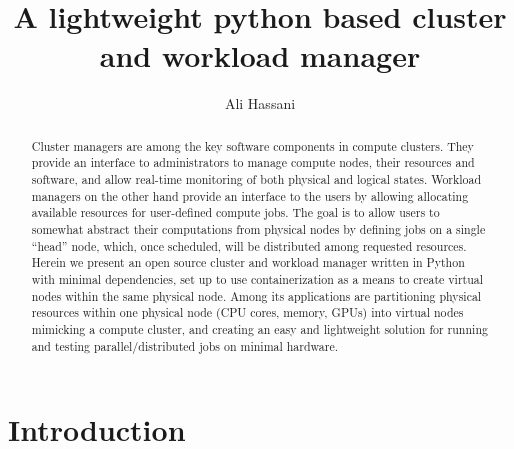 \documentclass[sigconf]{acmart}
\begin{document}
\title{A lightweight python based cluster and workload manager}


\author{Ali Hassani}

\renewcommand{\shortauthors}{Hassani}

\begin{abstract}
    Cluster managers are among the key software components in compute clusters.
    They provide an interface to administrators to manage compute nodes, their resources and software, and allow real-time
    monitoring of both physical and logical states. Workload managers on the other hand provide an interface to the users by
    allowing allocating available resources for user-defined compute jobs.
    The goal is to allow users to somewhat abstract their computations from physical nodes by defining jobs on a single ``head''
    node, which, once scheduled, will be distributed among requested resources.
    Herein we present an open source cluster and workload manager written in Python with minimal dependencies, set up to use
    containerization as a means to create virtual nodes within the same physical node.
    Among its applications are partitioning physical resources within one physical node (CPU cores, memory, GPUs) into virtual
    nodes mimicking a compute cluster, and creating an easy and lightweight solution for running and testing 
    parallel/distributed jobs on minimal hardware.
\end{abstract}

\maketitle

\section{Introduction}
\end{document}
